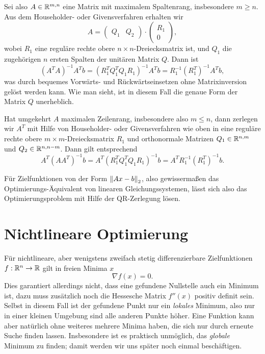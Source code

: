 Sei also $A\in\mathbb{R}^{m,n}$ eine Matrix mit maximalem Spaltenrang,
insbesondere $m \ge n$. Aus dem Householder- oder Givensverfahren
erhalten wir
\begin{equation}
  A = 
  \begin{pmatrix}
    Q_1 & Q_2
  \end{pmatrix}
  \cdot
  \begin{pmatrix}
    R_1\\
    0
  \end{pmatrix},
\end{equation}
wobei $R_1$ eine reguläre rechte obere $n\times n$-Dreiecksmatrix ist,
und $Q_1$ die zugehörigen $n$ ersten Spalten der unitären Matrix $Q$.
Dann ist
\begin{equation}
  (A^TA)^{-1}A^Tb = (R_1^TQ_1^TQ_1 R_1)^{-1}A^Tb =
  R_1^{-1}\left(R_1^T\right)^{-1}A^Tb,
\end{equation}
was durch bequemes Vorwärts- und Rückwärtseinsetzen ohne
Matrixinversion gelöst werden kann. Wie man sieht, ist in diesem Fall
die genaue Form der Matrix $Q$ unerheblich.

Hat umgekehrt $A$ maximalen Zeilenrang, insbesondere also $m \le n$,
dann zerlegen wir $A^T$ mit Hilfe von Householder- oder
Givensverfahren wie oben in eine reguläre rechte obere $m\times
m$-Dreiecksmatrix $R_1$ und orthonormale Matrizen $Q_1\in\mathbb{R}^{n,m}$
und $Q_2\in\mathbb{R}^{n,n-m}$. Dann gilt entsprechend
\begin{equation}
  A^T(AA^T)^{-1}b = A^T(R_1^TQ_1^TQ_1 R_1)^{-1}b =
  A^TR_1^{-1}\left(R_1^T\right)^{-1}b.
\end{equation}

Für Zielfunktionen von der Form $\left\lVert{Ax-b}\right\rVert_2$, also gewissermaßen
das Optimierungs-Äquivalent von linearen Gleichungssystemen, lässt
sich also das Optimierungsproblem mit Hilfe der QR-Zerlegung lösen.

\section{Nichtlineare Optimierung}

Für nichtlineare, aber wenigstens zweifach stetig differenzierbare
Zielfunktionen $f:\mathbb{R}^n\to \mathbb{R}$ gilt in freien Minima $x$
\begin{equation}
  \label{eq:mingrad}
  \nabla f(x) = 0.
\end{equation}
Dies garantiert allerdings nicht, dass eine gefundene Nullstelle auch
ein Minimum ist, dazu muss zusätzlich noch die Hessesche Matrix
$f''(x)$ positiv definit sein. Selbst in diesem Fall ist der gefundene
Punkt nur ein \emph{lokales} Minimum, also nur in einer kleinen
Umgebung sind alle anderen Punkte höher. Eine Funktion kann aber
natürlich ohne weiteres mehrere Minima haben, die sich nur durch
erneute Suche finden lassen. Insbesondere ist es praktisch unmöglich,
das \emph{globale} Minimum zu finden; damit werden wir uns später noch
einmal beschäftigen.

